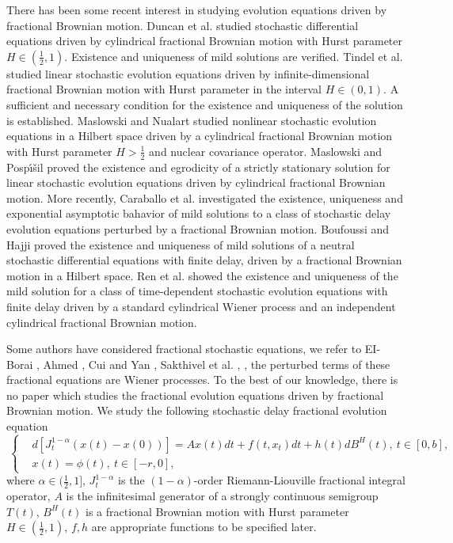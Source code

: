 \documentclass[12pt,a4paper,oneside,reqno,notitlepage]{amsart}
\theoremstyle{plain}
\numberwithin{equation}{section}
\begin{document}
There has been some recent interest in studying evolution equations driven by fractional Brownian motion. Duncan et al. \cite{Duncan} studied stochastic differential equations
driven by cylindrical fractional Brownian motion with Hurst parameter  $H\in(\frac{1}{2},1)$. Existence and uniqueness of mild solutions are verified.
Tindel et al. \cite{Tindel} studied linear stochastic evolution equations driven by infinite-dimensional fractional Brownian motion with Hurst parameter in the interval $H\in(0,1)$.
A sufficient and necessary condition for the existence and uniqueness of the
solution is established. Maslowski and Nualart \cite{Maslowski} studied nonlinear stochastic evolution equations in a Hilbert space driven by a cylindrical fractional Brownian motion with Hurst parameter
$H>\frac{1}{2}$ and nuclear covariance operator.  Maslowski and Posp\'{\i}\v{s}il \cite{MJ} proved the existence and egrodicity of a strictly stationary solution for linear stochastic
evolution equations driven by cylindrical fractional Brownian motion.  More recently, Caraballo et al. \cite{Caraballo} investigated the existence, uniqueness and exponential asymptotic bahavior of mild
solutions to a class of stochastic delay evolution equations perturbed by a fractional Brownian motion. Boufoussi and Hajji \cite{Boufoussi} proved the existence and uniqueness of mild solutions of a neutral stochastic differential equations with finite delay, driven by a fractional Brownian motion in a Hilbert space. Ren et al. \cite{YXR} showed the existence and uniqueness of the mild solution for a class of time-dependent stochastic evolution equations with finite delay driven by a standard cylindrical Wiener process and an independent cylindrical fractional Brownian motion.

Some authors have considered  fractional stochastic equations, we refer to EI-Borai \cite{EIBorai}, Ahmed \cite{Ahmed}, Cui and Yan \cite{Cui}, Sakthivel et al. \cite{RPY}, \cite {RPN},  the perturbed terms of these fractional equations are Wiener processes.
To the best of our knowledge, there is no paper which studies the fractional evolution
equations driven by fractional Brownian motion. We study the following
stochastic delay fractional evolution equation
\begin{equation}\label{fbm}
 \ \left\{\begin{aligned} &d[J_{t}^{1-\alpha}(x(t)-x(0))]=Ax(t)dt+f(t,x_{t})dt+h(t)dB^{H}(t), \ t\in [0,b],\\
&x(t)=\phi(t), \ t\in[-r,0],
\end{aligned}\right.
\end{equation}
where $\alpha\in(\frac{1}{2},1]$, $J_{t}^{1-\alpha}$ is the $(1-\alpha)$-order Riemann-Liouville fractional
integral operator, $A$ is the infinitesimal generator of a strongly continuous semigroup $T(t)$, $B^{H}(t)$ is a fractional Brownian motion with Hurst parameter $H\in(\frac{1}{2},1)$, $f,h$ are appropriate functions to be specified later.
\end{document}
